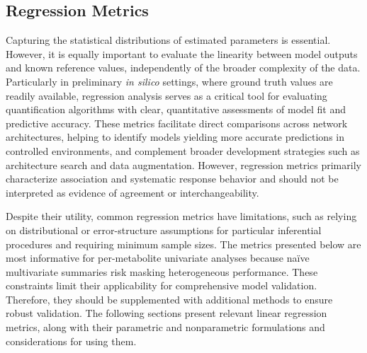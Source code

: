 \subsection{Regression Metrics}
\label{sec:Eval:subsec:RegMetrics}
Capturing the statistical distributions of estimated parameters is essential. However, it is equally important to evaluate the linearity between model outputs and known reference values, independently of the broader complexity of the data. Particularly in preliminary \textit{in silico} settings, where ground truth values are readily available, regression analysis serves as a critical tool for evaluating quantification algorithms with clear, quantitative assessments of model fit and predictive accuracy. These metrics facilitate direct comparisons across network architectures, helping to identify models yielding more accurate predictions in controlled environments, and complement broader development strategies such as architecture search and data augmentation. However, regression metrics primarily characterize association and systematic response behavior and should not be interpreted as evidence of agreement or interchangeability.

Despite their utility, common regression metrics have limitations, such as relying on distributional or error-structure assumptions for particular inferential procedures and requiring minimum sample sizes. The metrics presented below are most informative for per-metabolite univariate analyses because na\"{i}ve multivariate summaries risk masking heterogeneous performance. These constraints limit their applicability for comprehensive model validation. Therefore, they should be supplemented with additional methods to ensure robust validation. The following sections present relevant linear regression metrics, along with their parametric and nonparametric formulations and considerations for using them.

